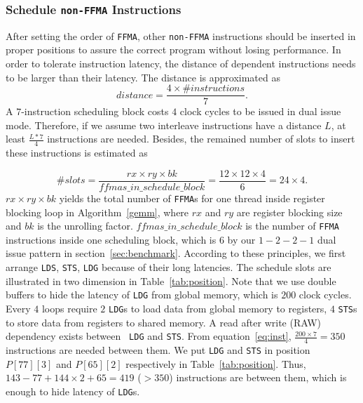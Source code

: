 \subsubsection{Schedule {\tt non-FFMA} Instructions}

After setting the order of {\tt FFMA}, other {\tt non-FFMA} instructions should be inserted in proper positions to 
assure the correct program without losing performance. In order to tolerate instruction latency, the
distance of dependent instructions needs to be larger than their latency. The distance is approximated as
\begin{equation}
\label{eq:inst}
distance = \frac{4\times\#instructions}{7}.
\end{equation}
A $7$-instruction scheduling block costs $4$ clock cycles to be issued in dual issue mode. 
Therefore, if we assume two interleave instructions have a distance $L$, at least $\frac{L*7}{4}$ instructions are needed. 
Besides, the remained number of slots 
to insert these instructions is estimated as

\begin{displaymath}
\#slots = \frac{rx\times ry\times bk}{ffmas\_in\_schedule\_block}=\frac{12\times 12\times 4}{6}=24\times 4.
\end{displaymath}
$rx\times ry\times bk$ yields the total number of {\tt FFMA}s for one thread inside register blocking loop in Algorithm~\ref{gemm}, where $rx$ and $ry$ are register blocking size and $bk$ is the unrolling factor.
$ffmas\_in\_schedule\_block$ is the number of {\tt FFMA} instructions inside one scheduling block, which is $6$ by our $1-2-2-1$ dual issue pattern in section~\ref{sec:benchmark}.
According to these principles, we first arrange {\tt LDS}, {\tt STS}, {\tt LDG} because of their long latencies. The
schedule slots are illustrated in two dimension in Table~\ref{tab:position}.
Note that we use double buffers to hide the latency of {\tt LDG} from global memory, which is $200$ clock cycles.
Every $4$ loops require $2$ {\tt LDG}s to load data from global memory to registers, $4$ {\tt STS}s to store data from 
registers to shared memory. A read after write (RAW) dependency exists between {\tt
LDG} and {\tt STS}. 
From equation~\ref{eq:inst}, $\frac{200\times 7}{4} = 350$ instructions are needed between them.
We put {\tt LDG} and  {\tt STS} in position $P[77][3]$ and $P[65][2]$ respectively in Table~\ref{tab:position}. 
Thus, $143-77 + 144\times 2 + 65=419$ ($>350$) instructions are between them, which is enough to hide latency of {\tt LDG}s.

